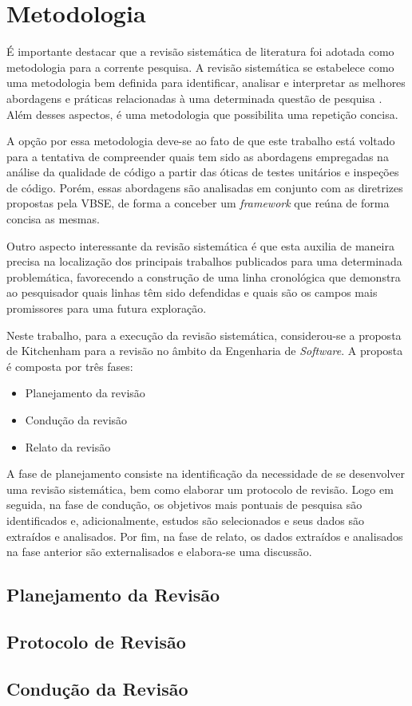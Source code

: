 \chapter{Metodologia}

É importante destacar que a revisão sistemática de literatura foi adotada como metodologia para a corrente pesquisa. A revisão sistemática se estabelece como uma metodologia bem definida para identificar, analisar e interpretar as melhores abordagens e práticas relacionadas à uma determinada questão de pesquisa \cite{sistematica}. Além desses aspectos, é uma metodologia que possibilita uma repetição concisa.

A opção por essa metodologia deve-se ao fato de que este trabalho está voltado para a tentativa de compreender quais tem sido as abordagens empregadas na análise da qualidade de código a partir das óticas de testes unitários e inspeções de código. Porém, essas abordagens são analisadas em conjunto com as diretrizes propostas pela VBSE, de forma a conceber um \textit{framework} que reúna de forma concisa as mesmas.

Outro aspecto interessante da revisão sistemática é que esta auxilia de maneira precisa na localização dos principais trabalhos publicados para uma determinada problemática, favorecendo a construção de uma linha cronológica que demonstra ao pesquisador quais linhas têm sido defendidas e quais são os campos mais promissores para uma futura exploração.

Neste trabalho, para a execução da revisão sistemática, considerou-se a proposta de Kitchenham para a revisão no âmbito da Engenharia de \textit{Software}. A proposta é composta por três fases:

\begin{itemize}
	\item Planejamento da revisão
	\item Condução da revisão
	\item Relato da revisão
\end{itemize}

A fase de planejamento consiste na identificação da necessidade de se desenvolver uma revisão sistemática, bem como elaborar um protocolo de revisão. Logo em seguida, na fase de condução, os objetivos mais pontuais de pesquisa são identificados e, adicionalmente, estudos são selecionados e seus dados são extraídos e analisados. Por fim, na fase de relato, os dados extraídos e analisados na fase anterior são externalisados e elabora-se uma discussão.

\section{Planejamento da Revisão}

\section{Protocolo de Revisão}

\section{Condução da Revisão}